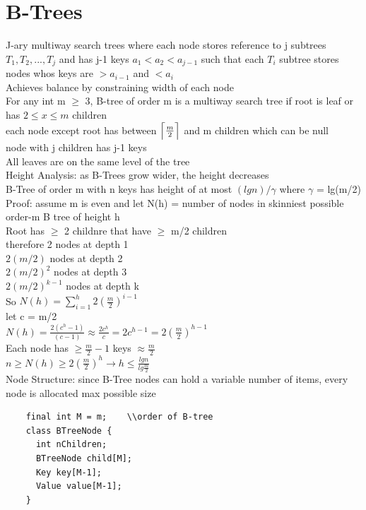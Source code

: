 \documentclass{article}
\DeclarePairedDelimiter{\ceil}{\lceil}{\rceil}
\begin{document}
  \section{B-Trees}
  J-ary multiway search trees where each node stores reference to j subtrees $T_{1}, T_{2}, ..., T_{j}$ and has j-1 keys $a_{1} < a_{2} < a_{j-1}$ such that each $T_{i}$ subtree stores nodes whos keys are $> a_{i-1}$ and $< a_{i}$\\ 
  Achieves balance by constraining width of each node \\
  For any int m $\geq$ 3, B-tree of order m is a multiway search tree if 
  \indent root is leaf or has $2 \leq x \leq m$ children \\
  \indent each node except root has between $\ceil[\Big]{\frac{m}{2}}$ and m children which can be null\\
  \indent \indent node with j children has j-1 keys\\
  \indent All leaves are on the same level of the tree\\
  Height Analysis: as B-Trees grow wider, the height decreases\\
  B-Tree of order m with n keys has height of at most $(lgn)/\gamma$ where $\gamma$ = lg(m/2)\\
  Proof: assume m is even and let N(h) = number of nodes in skinniest possible order-m B tree of height h\\
  \indent Root has $\geq$ 2 childnre that have $\geq$ m/2 children \\
  \indent \indent therefore 2 nodes at depth 1\\
  \indent \indent $2(m/2)$ nodes at depth 2\\
  \indent \indent $2(m/2)^{2}$ nodes at depth 3\\
  \indent \indent $2(m/2)^{k-1}$ nodes at depth k\\
  \indent So $N(h) = \sum_{i=1}^{h}2(\frac{m}{2})^{i-1}$\\
  \indent let c = m/2\\
  \indent $N(h) = \frac{2(c^{h}-1)}{(c-1)} \approx \frac{2c^{h}}{c} = 2c^{h-1} = 2(\frac{m}{2})^{h-1}$\\
  \indent Each node has $\geq \frac{m}{2}-1$ keys $\approx \frac{m}{2}$\\
  \indent $n \geq N(h) \geq 2(\frac{m}{2})^{h} \rightarrow h \leq \frac{lgn}{lg\frac{m}{2}}$\\
  Node Structure: since B-Tree nodes can hold a variable number of items, every node is allocated max possible size
  \begin{lstlisting}
    final int M = m;    \\order of B-tree
    class BTreeNode {
      int nChildren;
      BTreeNode child[M];
      Key key[M-1];
      Value value[M-1]; 
    }
  \end{lstlisting}
\end{document}
